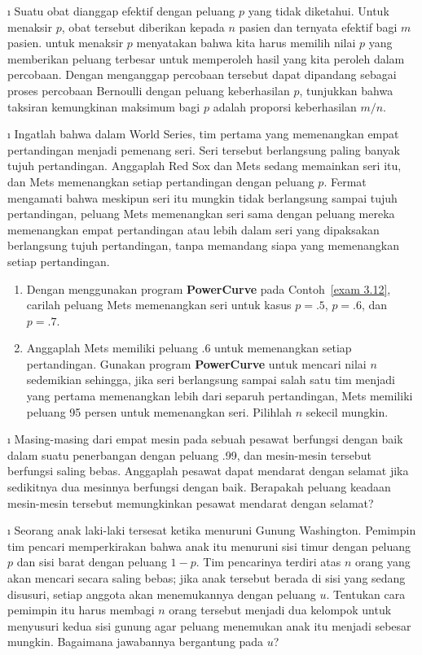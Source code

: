 \begin{LJSItem}
\i\label{exer 3.2.29} Suatu obat dianggap efektif dengan peluang $p$ yang tidak
diketahui.  Untuk menaksir $p$, obat tersebut diberikan kepada $n$ pasien dan ternyata
efektif bagi $m$ pasien.   untuk menaksir $p$ menyatakan bahwa kita harus memilih nilai $p$ yang
memberikan peluang terbesar untuk memperoleh hasil yang kita peroleh dalam percobaan.
Dengan menganggap percobaan tersebut dapat dipandang sebagai proses percobaan Bernoulli
dengan peluang keberhasilan $p$, tunjukkan bahwa taksiran kemungkinan maksimum bagi $p$
adalah proporsi keberhasilan $m/n$.

\i\label{exer 3.2.30} Ingatlah bahwa dalam World Series, tim pertama yang memenangkan
empat pertandingan menjadi pemenang seri.  Seri tersebut berlangsung paling banyak
tujuh pertandingan.  Anggaplah Red Sox dan Mets sedang memainkan seri itu, dan Mets
memenangkan setiap pertandingan dengan peluang $p$.  Fermat mengamati bahwa meskipun
seri itu mungkin tidak berlangsung sampai tujuh pertandingan, peluang Mets memenangkan
seri sama dengan peluang mereka memenangkan empat pertandingan atau lebih dalam seri
yang dipaksakan berlangsung tujuh pertandingan, tanpa memandang siapa yang memenangkan
setiap pertandingan.

\begin{enumerate}
\item Dengan menggunakan program {\bf PowerCurve} pada Contoh~\ref{exam 3.12}, carilah
peluang Mets memenangkan seri untuk kasus $p = .5$, $p = .6$, dan $p =.7$.

\item Anggaplah Mets memiliki peluang .6 untuk memenangkan setiap pertandingan.  Gunakan
program {\bf PowerCurve} untuk mencari nilai $n$ sedemikian sehingga, jika seri
berlangsung sampai salah satu tim menjadi yang pertama memenangkan lebih dari separuh
pertandingan, Mets memiliki peluang 95 persen untuk memenangkan seri.  Pilihlah $n$
sekecil mungkin.
\end{enumerate}

\i\label{exer 3.2.31} Masing-masing dari empat mesin pada sebuah pesawat berfungsi
dengan baik dalam suatu penerbangan dengan peluang .99, dan mesin-mesin tersebut
berfungsi saling bebas.  Anggaplah pesawat dapat mendarat dengan selamat jika sedikitnya
dua mesinnya berfungsi dengan baik.  Berapakah peluang keadaan mesin-mesin tersebut
memungkinkan pesawat mendarat dengan selamat?

\i\label{exer 3.2.32} Seorang anak laki-laki tersesat ketika menuruni Gunung
Washington.  Pemimpin tim pencari memperkirakan bahwa anak itu menuruni sisi timur
dengan peluang $p$ dan sisi barat dengan peluang $1 - p$.  Tim pencarinya terdiri atas
$n$ orang yang akan mencari secara saling bebas; jika anak tersebut berada di sisi yang
sedang disusuri, setiap anggota akan menemukannya dengan peluang $u$.  Tentukan cara
pemimpin itu harus membagi $n$ orang tersebut menjadi dua kelompok untuk menyusuri kedua
sisi gunung agar peluang menemukan anak itu menjadi sebesar mungkin.  Bagaimana
jawabannya bergantung pada $u$?


\end{LJSItem}
